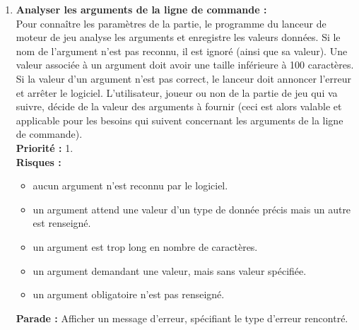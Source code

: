 \begin{enumerate}

    \item \textbf{Analyser les arguments de la ligne de commande :}\\
    Pour connaître les paramètres de la partie, le programme du lanceur de moteur de jeu analyse les arguments et enregistre les valeurs données. Si le nom de l'argument n'est pas reconnu, il est ignoré (ainsi que sa valeur). Une valeur associée à un argument doit avoir une taille inférieure à 100 caractères. Si la valeur d'un argument n'est pas correct, le lanceur doit annoncer l'erreur et arrêter le logiciel. L'utilisateur, joueur ou non de la partie de jeu qui va suivre, décide de la valeur des arguments à fournir (ceci est alors valable et applicable pour les besoins qui suivent concernant les arguments de la ligne de commande). \\
    \textbf{Priorité :} 1. \\
    \textbf{Risques :}
    \begin{itemize}
        \item aucun argument n'est reconnu par le logiciel.
        \item un argument attend une valeur d'un type de donnée précis mais un autre est renseigné.
        \item un argument est trop long en nombre de caractères.
        \item un argument demandant une valeur, mais sans valeur spécifiée.
        \item un argument obligatoire n'est pas renseigné.
    \end{itemize}
    \textbf{Parade :} Afficher un message d'erreur, spécifiant le type d'erreur rencontré.
    

\end{enumerate}
